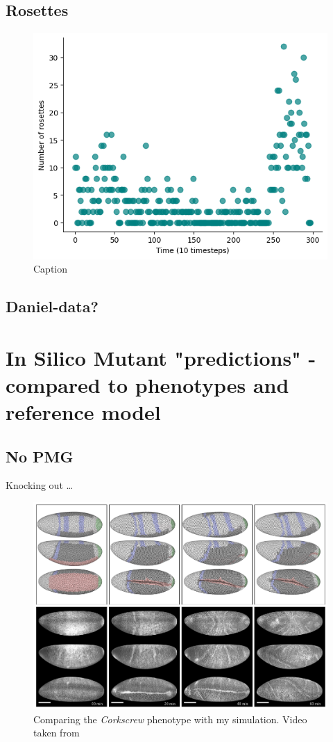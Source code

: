 \subsection{Rosettes}
\begin{figure}[H]
    \centering
    \includegraphics[width=0.5\linewidth]{chapters/Results/figures/rosettes_time.png}
    \caption{Caption}
    \label{fig:enter-label}
\end{figure}

\subsection{Daniel-data?}
\newpage
\section{In Silico Mutant "predictions" - compared to phenotypes and reference model}
\subsection{No PMG}

Knocking out \dots

\begin{figure}[H]
    \centering
    \includegraphics[width=1\linewidth]{chapters/Results/figures/corkscrew_comparison.png}
    \caption{Comparing the \textit{Corkscrew} phenotype with my simulation. Video taken from \cite{smits2023maintaining}}
    \label{fig:corkscrew-comparison}
\end{figure}
